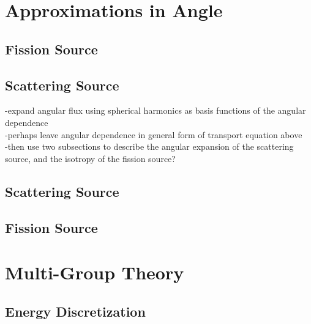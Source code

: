 \section{Approximations in Angle}
\label{sec:chap2-angle}

\subsection{Fission Source}
\label{sec:chap2-angle-fiss}


\subsection{Scattering Source}
\label{sec:chap2-angle-scatt}

-expand angular flux using spherical harmonics as basis functions of the angular dependence\\
-perhaps leave angular dependence in general form of transport equation above\\
-then use two subsections to describe the angular expansion of the scattering source, and the isotropy of the fission source?\\

\subsection{Scattering Source}
\label{subsec:chap2-scatt-src}

\subsection{Fission Source}
\label{subsec:chap2-fiss-src}


\section{Multi-Group Theory}
\label{sec:chap2-mg-theory}

\subsection{Energy Discretization}
\label{sec:chap2-energy}

